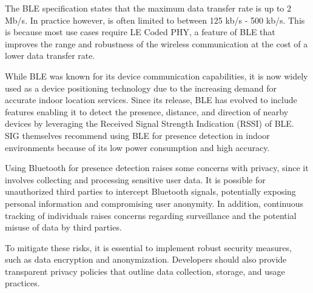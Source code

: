 The BLE specification states that the maximum data transfer rate is up to 2 Mb/s.
In practice however, is often limited to between 125 kb/s - 500 kb/s.
This is because most use cases require LE Coded PHY, a feature of BLE that improves the range and robustness of the wireless communication at the cost of a lower data transfer rate.

While BLE was known for its device communication capabilities, it is now widely used as a device positioning technology due to the increasing demand for accurate indoor location services.
Since its release, BLE has evolved to include features enabling it to detect the presence, distance, and direction of nearby devices by leveraging the Received Signal Strength Indication (RSSI) of BLE.
SIG themselves recommend using BLE for presence detection in indoor environments because of its low power consumption and high accuracy.\cite{BluetoothSIG}

Using Bluetooth for presence detection raises some concerns with privacy, since it involves collecting and processing sensitive user data.
It is possible for unauthorized third parties to intercept Bluetooth signals, potentially exposing personal information and compromising user anonymity.
In addition, continuous tracking of individuals raises concerns regarding surveillance and the potential misuse of data by third parties.

To mitigate these risks, it is essential to implement robust security measures, such as data encryption and anonymization.
Developers should also provide transparent privacy policies that outline data collection, storage, and usage practices.\cite{BluetoothPrivacy}\cite{BLE_Security}